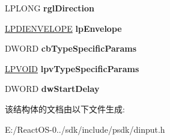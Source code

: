 \begin{DoxyCompactItemize}
\item 
\mbox{\label{struct_d_i_e_f_f_e_c_t_a9ebd4888a32e17ecc9427acbe6ffa63f}} 
L\+P\+L\+O\+NG {\bfseries rgl\+Direction}
\item 
\mbox{\label{struct_d_i_e_f_f_e_c_t_a1d55b6f5b087be8a4610512d18520f33}} 
\hyperlink{struct_d_i_e_n_v_e_l_o_p_e}{L\+P\+D\+I\+E\+N\+V\+E\+L\+O\+PE} {\bfseries lp\+Envelope}
\item 
\mbox{\label{struct_d_i_e_f_f_e_c_t_af091a9ccd8d772e65159dda0b15750f8}} 
D\+W\+O\+RD {\bfseries cb\+Type\+Specific\+Params}
\item 
\mbox{\label{struct_d_i_e_f_f_e_c_t_a8b1994ee61dc5712f52b6fc1d77e28ac}} 
\hyperlink{interfacevoid}{L\+P\+V\+O\+ID} {\bfseries lpv\+Type\+Specific\+Params}
\item 
\mbox{\label{struct_d_i_e_f_f_e_c_t_ae8ec66d0f61f2a330de17abb59e4f4b4}} 
D\+W\+O\+RD {\bfseries dw\+Start\+Delay}
\end{DoxyCompactItemize}


该结构体的文档由以下文件生成\+:\begin{DoxyCompactItemize}
\item 
E\+:/\+React\+O\+S-\/0../sdk/include/psdk/dinput.\+h\end{DoxyCompactItemize}
